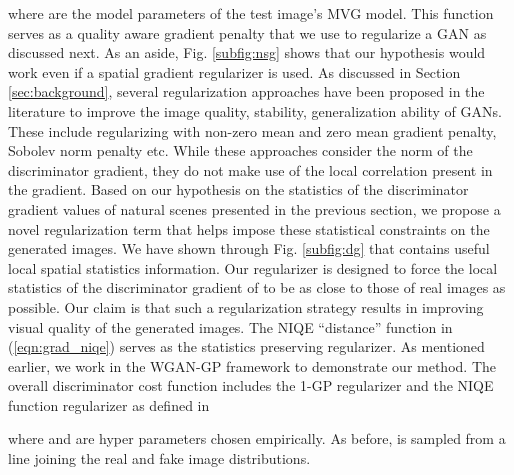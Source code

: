 \documentclass{article}
\begin{document}
where  are the model parameters of the test image's MVG model. 
This function serves as a quality aware gradient penalty that we use to regularize a GAN as discussed next. As an aside, Fig. \ref{subfig:nsg} shows that our hypothesis would work even if a spatial gradient regularizer is used.
As discussed in Section \ref{sec:background}, several regularization approaches have been proposed in the literature to improve the image quality, stability, generalization ability of GANs. These include regularizing with non-zero mean and zero mean gradient penalty, Sobolev norm penalty etc. While these approaches consider the norm of the discriminator gradient, they do not make use of the local correlation present in the gradient.
Based on our hypothesis on the statistics of the discriminator gradient values of natural scenes presented in the previous section, we propose a novel regularization term that helps impose these statistical constraints on the generated images. 
We have shown through Fig. \ref{subfig:dg} that  contains useful local spatial statistics information. Our regularizer is designed to force the local statistics of the discriminator gradient of  to be as close to those of real images as possible. Our claim is that such a regularization strategy results in improving visual quality of the generated images. The NIQE ``distance'' function in (\ref{eqn:grad_niqe}) serves as the statistics preserving regularizer. As mentioned earlier, we work in the WGAN-GP framework to demonstrate our method. The overall discriminator cost function includes the 1-GP regularizer and the NIQE function regularizer as defined in

where  and  are hyper parameters chosen empirically. As before,  is sampled from a line joining the real and fake image distributions.
\end{document}
